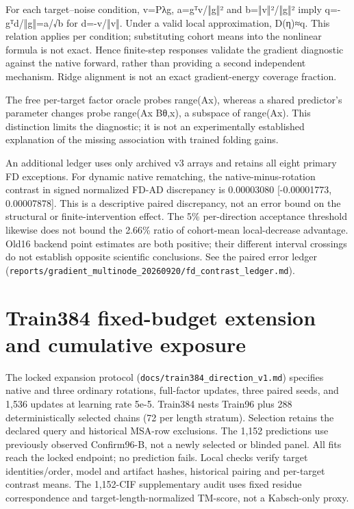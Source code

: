 For each target--noise condition, v=Pλg, a=gᵀv/‖g‖² and b=‖v‖²/‖g‖² imply
q=-gᵀd/‖g‖=a/√b for d=-v/‖v‖. Under a valid local approximation, D(η)≈q.
This relation applies per condition; substituting cohort means into the nonlinear
formula is not exact. Hence finite-step responses validate the gradient diagnostic
against the native forward, rather than providing a second independent mechanism.
Ridge alignment is not an exact gradient-energy coverage fraction.

The free per-target factor oracle probes range(Ax), whereas a shared predictor's
parameter changes probe range(Ax Bθ,x), a subspace of range(Ax). This distinction
limits the diagnostic; it is not an experimentally established explanation of
the missing association with trained folding gains.

An additional ledger uses only archived v3 arrays and retains all eight primary
FD exceptions. For dynamic native rematching, the native-minus-rotation contrast
in signed normalized FD-AD discrepancy is 0.00003080 {[}-0.00001773, 0.00007878{]}.
This is a descriptive paired discrepancy, not an error bound on the structural
or finite-intervention effect. The 5\% per-direction acceptance threshold likewise
does not bound the 2.66\% ratio of cohort-mean local-decrease advantage. Old16
backend point estimates are both positive; their different interval crossings
do not establish opposite scientific conclusions.
See the paired error ledger (\nolinkurl{reports/gradient_multinode_20260920/fd_contrast_ledger.md}).

\section{Train384 fixed-budget extension and cumulative exposure}\label{train384-fixed-budget-extension-and-cumulative-exposure}

The locked expansion protocol (\nolinkurl{docs/train384_direction_v1.md}) specifies
native and three ordinary rotations, full-factor updates, three paired seeds,
and 1,536 updates at learning rate 5e-5. Train384 nests Train96 plus 288
deterministically selected chains (72 per length stratum). Selection retains
the declared query and historical MSA-row exclusions. The 1,152 predictions
use previously observed Confirm96-B, not a newly selected or blinded panel.
All fits reach the locked endpoint; no prediction fails. Local checks verify
target identities/order, model and artifact hashes, historical pairing and
per-target contrast means. The 1,152-CIF supplementary audit uses fixed residue
correspondence and target-length-normalized TM-score, not a Kabsch-only proxy.

